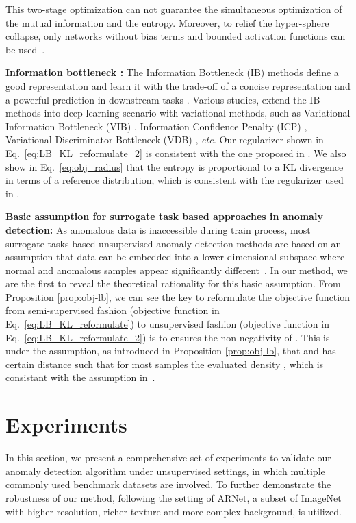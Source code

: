 \documentclass[journal]{IEEEtran}
\theoremstyle{remark}
\begin{document}
This two-stage optimization can not guarantee the simultaneous optimization of the mutual information and the entropy. Moreover, to relief the hyper-sphere collapse, only networks without bias terms and bounded activation functions can be used~\cite{SVDD}.

\textbf{Information bottleneck \cite{tishby2000information,tishby2015deep}:}
The Information Bottleneck (IB) methods define a good representation and learn it with the trade-off of  a concise representation and  a powerful prediction in downstream tasks \cite{tishby2000information,tishby2015deep}. Various studies, extend the IB methods into deep learning scenario with variational methods, such as Variational Information Bottleneck (VIB) \cite{VIB}, Information Confidence Penalty (ICP) \cite{ICP}, Variational Discriminator Bottleneck (VDB) \cite{VDB}, \textit{etc.} Our regularizer shown in Eq.~\ref{eq:LB_KL_reformulate_2} is consistent with the one proposed in \cite{ICP}. We also show in Eq.~\ref{eq:obj_radius} that the entropy is proportional to a KL divergence in terms of a reference distribution, which is consistent with the regularizer used in \cite{VIB,VDB}.

\textbf{Basic assumption for surrogate task based approaches in anomaly detection:} As anomalous data is inaccessible during train process, most surrogate tasks based unsupervised anomaly detection methods are based on an assumption that data can be embedded into a lower-dimensional subspace where normal and anomalous samples appear significantly different~\cite{chandola2009anomaly}. In our method, we are the first to reveal the theoretical rationality for this basic assumption. From Proposition \ref{prop:obj-lb}, we can see the key to reformulate the objective function from semi-supervised fashion (objective function in Eq.~\ref{eq:LB_KL_reformulate}) to unsupervised fashion (objective function in Eq.~\ref{eq:LB_KL_reformulate_2}) is to ensures the non-negativity of . This is under the assumption, as introduced in Proposition \ref{prop:obj-lb}, that  and  has certain distance such that for most samples  the evaluated density  , which is consistant with the assumption in~\cite{chandola2009anomaly}.

\section{Experiments}
In this section, we present a comprehensive set of experiments to validate our anomaly detection algorithm under unsupervised settings, in which multiple commonly used benchmark datasets are involved. To further demonstrate the robustness of our method, following the setting of ARNet\cite{fye2020ARNet}, a subset of ImageNet~\cite{russakovsky2015imagenet} with higher resolution, richer texture and more complex background, is utilized. 
\end{document}
